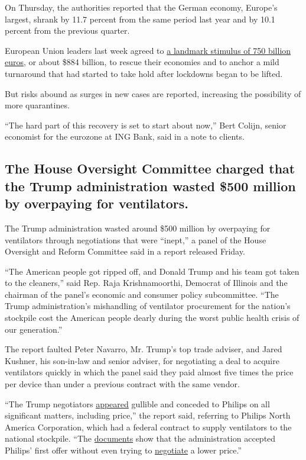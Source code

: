 On Thursday, the authorities reported that the German economy, Europe's
largest, shrank by 11.7 percent from the same period last year and by
10.1 percent from the previous quarter.

European Union leaders last week agreed to
\href{https://www.nytimes3xbfgragh.onion/2020/07/20/world/europe/eu-stimulus-coronavirus.html}{a
landmark stimulus of 750 billion euros}, or about \$884 billion, to
rescue their economies and to anchor a mild turnaround that had started
to take hold after lockdowns began to be lifted.

But risks abound as surges in new cases are reported, increasing the
possibility of more quarantines.

``The hard part of this recovery is set to start about now,'' Bert
Colijn, senior economist for the eurozone at ING Bank, said in a note to
clients.

\hypertarget{the-house-oversight-committee-charged-that-the-trump-administration-wasted-500-million-by-overpaying-for-ventilators}{%
\subsection{The House Oversight Committee charged that the Trump
administration wasted \$500 million by overpaying for
ventilators.}\label{the-house-oversight-committee-charged-that-the-trump-administration-wasted-500-million-by-overpaying-for-ventilators}}

The Trump administration wasted around \$500 million by overpaying for
ventilators through negotiations that were ``inept,'' a panel of the
House Oversight and Reform Committee said in a report released Friday.

``The American people got ripped off, and Donald Trump and his team got
taken to the cleaners,'' said Rep. Raja Krishnamoorthi, Democrat of
Illinois and the chairman of the panel's economic and consumer policy
subcommittee. ``The Trump administration's mishandling of ventilator
procurement for the nation's stockpile cost the American people dearly
during the worst public health crisis of our generation.''

The report faulted Peter Navarro, Mr. Trump's top trade adviser, and
Jared Kushner, his son-in-law and senior adviser, for negotiating a deal
to acquire ventilators quickly in which the panel said they paid almost
five times the price per device than under a previous contract with the
same vendor.

``The Trump negotiators
\href{https://oversight.house.gov/sites/democrats.oversight.house.gov/files/1122-1125_Redacted.pdf}{appeared}
gullible and conceded to Philips on all significant matters, including
price,'' the report said, referring to Philips North America
Corporation, which had a federal contract to supply ventilators to the
national stockpile. ``The
\href{https://oversight.house.gov/sites/democrats.oversight.house.gov/files/298-299_Redacted.pdf}{documents}
show that the administration accepted Philips' first offer without even
trying to
\href{https://oversight.house.gov/sites/democrats.oversight.house.gov/files/1251-1280_Redacted.pdf}{negotiate}
a lower price.''


